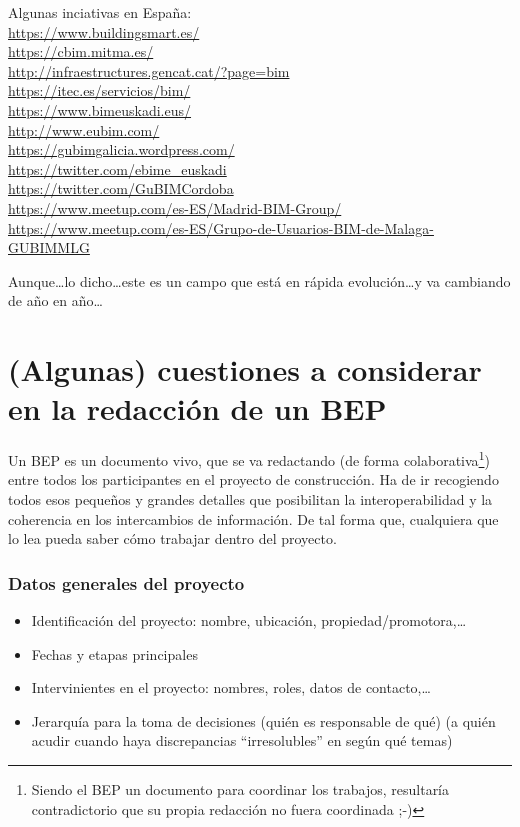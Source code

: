 \documentclass[spanish,12pt,a4paper,final,oneside]{book}
\begin{document}
\vspace{0.3cm}
Algunas inciativas en España:
\\ \url{https://www.buildingsmart.es/}
\\ \url{https://cbim.mitma.es/}
\\ \url{http://infraestructures.gencat.cat/?page=bim}
\\ \url{https://itec.es/servicios/bim/}
\\ \url{https://www.bimeuskadi.eus/}
\\ \url{http://www.eubim.com/}
\\ \url{https://gubimgalicia.wordpress.com/}
\\ \url{https://twitter.com/ebime_euskadi}
\\ \url{https://twitter.com/GuBIMCordoba}
\\ \url{https://www.meetup.com/es-ES/Madrid-BIM-Group/}
\\ \url{https://www.meetup.com/es-ES/Grupo-de-Usuarios-BIM-de-Malaga-GUBIMMLG}


\vspace{0.3cm}
Aunque\ldots lo dicho\ldots este es un campo que está en rápida evolución\ldots y va cambiando de año en año\ldots




\chapter{(Algunas) cuestiones a considerar en la redacción de un BEP}\label{cuestionesEnElBEP}


Un BEP es un documento vivo, que se va redactando (de forma colaborativa\footnote{Siendo el BEP un documento para coordinar los trabajos, resultaría contradictorio que su propia redacción no fuera coordinada ;-)}) entre todos los participantes en el proyecto de construcción. Ha de ir recogiendo todos esos pequeños y grandes detalles que posibilitan la interoperabilidad y la coherencia en los intercambios de información. De tal forma que, cualquiera que lo lea pueda saber cómo trabajar dentro del proyecto. 


\subsection{Datos generales del proyecto}
\begin{itemize}

\item Identificación del proyecto: nombre, ubicación, propiedad/promotora,\ldots

\item Fechas y etapas principales

\item Intervinientes en el proyecto: nombres, roles, datos de contacto,\ldots

\item Jerarquía para la toma de decisiones (quién es responsable de qué) ({\footnotesize a quién acudir cuando haya discrepancias ``irresolubles'' en según qué temas})

\end{itemize}
\end{document}
